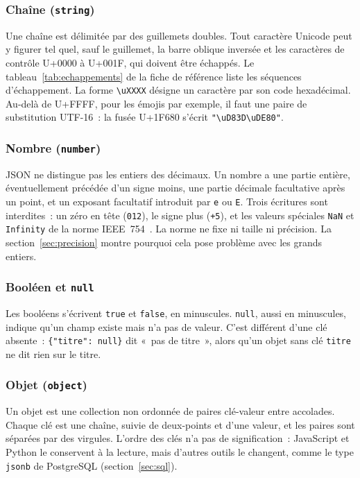 \documentclass[12pt,a4paper]{article}
\begin{document}
\subsubsection{Chaîne (\texttt{string})}
Une chaîne est délimitée par des guillemets doubles. Tout caractère Unicode peut y figurer tel quel, sauf le guillemet, la barre oblique inversée et les caractères de contrôle U+0000 à U+001F, qui doivent être échappés. Le tableau~\ref{tab:echappements} de la fiche de référence liste les séquences d'échappement. La forme \texttt{\textbackslash uXXXX} désigne un caractère par son code hexadécimal. Au-delà de U+FFFF, pour les émojis par exemple, il faut une paire de substitution UTF-16~: la fusée U+1F680 s'écrit \texttt{"\textbackslash uD83D\textbackslash uDE80"}.

\subsubsection{Nombre (\texttt{number})}
JSON ne distingue pas les entiers des décimaux. Un nombre a une partie entière, éventuellement précédée d'un signe moins, une partie décimale facultative après un point, et un exposant facultatif introduit par \texttt{e} ou \texttt{E}. Trois écritures sont interdites~: un zéro en tête (\texttt{012}), le signe plus (\texttt{+5}), et les valeurs spéciales \texttt{NaN} et \texttt{Infinity} de la norme IEEE~754~\cite{ieee754}. La norme ne fixe ni taille ni précision. La section~\ref{sec:precision} montre pourquoi cela pose problème avec les grands entiers.

\subsubsection{Booléen et \texttt{null}}
Les booléens s'écrivent \texttt{true} et \texttt{false}, en minuscules. \texttt{null}, aussi en minuscules, indique qu'un champ existe mais n'a pas de valeur. C'est différent d'une clé absente~: \texttt{\{"titre": null\}} dit «~pas de titre~», alors qu'un objet sans clé \texttt{titre} ne dit rien sur le titre.

\subsubsection{Objet (\texttt{object})}
Un objet est une collection non ordonnée de paires clé-valeur entre accolades. Chaque clé est une chaîne, suivie de deux-points et d'une valeur, et les paires sont séparées par des virgules. L'ordre des clés n'a pas de signification~: JavaScript et Python le conservent à la lecture, mais d'autres outils le changent, comme le type \texttt{jsonb} de PostgreSQL (section~\ref{sec:sql}).
\end{document}
